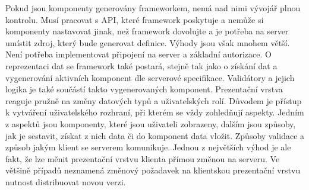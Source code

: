 Pokud jsou komponenty generovány frameworkem, nemá nad nimi vývojář plnou kontrolu. Musí pracovat s API, které framework poskytuje a nemůže si komponenty nastavovat jinak, než framework dovolujte a je potřeba na server umístit zdroj, který bude generovat definice. Výhody jsou však mnohem větší. Není potřeba implementovat připojení na server a základní autorizace. O reprezentaci dat se framework také postará, stejně tak jako o získání dat a vygenerování aktivních komponent dle serverové specifikace. Validátory a jejich logika je také součástí takto vygenerovaných komponent. Prezentační vrstva reaguje pružně na změny datových typů a uživatelských rolí. Důvodem je přístup k vytváření uživatelského rozhraní, při kterém se vždy zohledňují aspekty. Jedním z aspektů jsou komponenty, které jsou uživateli zobrazeny, dalším jsou způsoby, jak je sestavit, získat z nich data či do komponent data vložit. Způsoby validace a způsob jakým klient se serverem komunikuje. Jednou z největších výhod je ale fakt, že lze měnit prezentační vrstvu klienta přímou změnou na serveru. Ve většině případů neznamená změnový požadavek na klientskou prezentační vrstvu nutnost distribuovat novou verzi.


